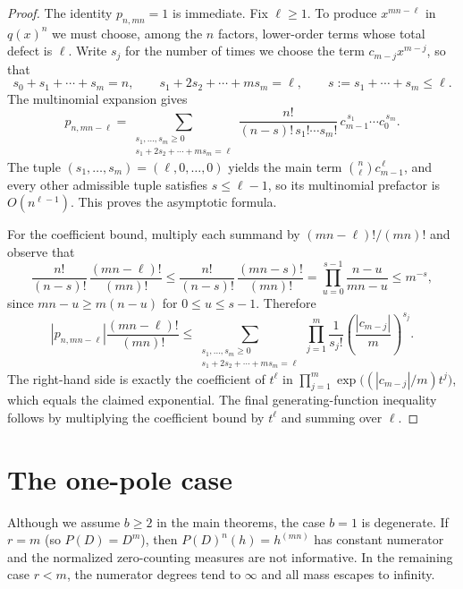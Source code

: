 \documentclass[12pt]{article}
\theoremstyle{plain}
\theoremstyle{definition}
\begin{document}
\begin{proof}
The identity $p_{n,mn}=1$ is immediate.
Fix $\ell\ge1$.
To produce $x^{mn-\ell}$ in $q(x)^n$ we must choose, among the $n$ factors, lower-order terms whose total defect is $\ell$.
Write $s_j$ for the number of times we choose the term $c_{m-j}x^{m-j}$, so that
$$s_0+s_1+\cdots+s_m=n,
\qquad
s_1+2s_2+\cdots+ms_m=\ell,
\qquad
s:=s_1+\cdots+s_m\le \ell.$$
The multinomial expansion gives
$$p_{n,mn-\ell}
=\sum_{\substack{s_1,\dots,s_m\ge0\\ s_1+2s_2+\cdots+ms_m=\ell}}
\frac{n!}{(n-s)!\,s_1!\cdots s_m!}\,c_{m-1}^{\,s_1}\cdots c_0^{\,s_m}.$$
The tuple $(s_1,\dots,s_m)=(\ell,0,\dots,0)$ yields the main term $\binom{n}{\ell}c_{m-1}^{\,\ell}$, and every other admissible tuple satisfies $s\le \ell-1$, so its multinomial prefactor is $O(n^{\ell-1})$.
This proves the asymptotic formula.

For the coefficient bound, multiply each summand by $(mn-\ell)!/(mn)!$ and observe that
$$\frac{n!}{(n-s)!}\,\frac{(mn-\ell)!}{(mn)!}
\le \frac{n!}{(n-s)!}\,\frac{(mn-s)!}{(mn)!}
=\prod_{u=0}^{s-1}\frac{n-u}{mn-u}\le m^{-s},$$
since $mn-u\ge m(n-u)$ for $0\le u\le s-1$.
Therefore
$$\left|p_{n,mn-\ell}\right|\frac{(mn-\ell)!}{(mn)!}
\le \sum_{\substack{s_1,\dots,s_m\ge0\\ s_1+2s_2+\cdots+ms_m=\ell}}
\prod_{j=1}^{m}\frac{1}{s_j!}\left(\frac{|c_{m-j}|}{m}\right)^{s_j}.$$
The right-hand side is exactly the coefficient of $t^\ell$ in
$\prod_{j=1}^{m}\exp\!\bigl((|c_{m-j}|/m)t^j\bigr)$, which equals the claimed exponential.
The final generating-function inequality follows by multiplying the coefficient bound by $t^\ell$ and summing over $\ell$.
\end{proof}

\section{The one-pole case}\label{app:onepole}

Although we assume $b\ge2$ in the main theorems, the case $b=1$ is degenerate.
If $r=m$ (so $P(D)=D^m$), then $P(D)^n(h)=h^{(mn)}$ has constant numerator and the normalized zero-counting measures are not informative.
In the remaining case $r<m$, the numerator degrees tend to $\infty$ and all mass escapes to infinity.
\end{document}
